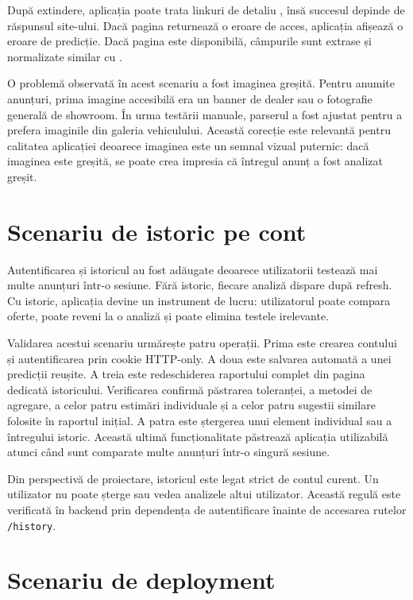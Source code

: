 După extindere, aplicația poate trata linkuri de detaliu \mobilede, însă succesul depinde de răspunsul site-ului. Dacă pagina returnează o eroare de acces, aplicația afișează o eroare de predicție. Dacă pagina este disponibilă, câmpurile sunt extrase și normalizate similar cu \autovit.

O problemă observată în acest scenariu a fost imaginea greșită. Pentru anumite anunțuri, prima imagine accesibilă era un banner de dealer sau o fotografie generală de showroom. În urma testării manuale, parserul a fost ajustat pentru a prefera imaginile din galeria vehiculului. Această corecție este relevantă pentru calitatea aplicației deoarece imaginea este un semnal vizual puternic: dacă imaginea este greșită, se poate crea impresia că întregul anunț a fost analizat greșit.

\section{Scenariu de istoric pe cont}
\label{sec:case-history}

Autentificarea și istoricul au fost adăugate deoarece utilizatorii testează mai multe anunțuri într-o sesiune. Fără istoric, fiecare analiză dispare după refresh. Cu istoric, aplicația devine un instrument de lucru: utilizatorul poate compara oferte, poate reveni la o analiză și poate elimina testele irelevante.

Validarea acestui scenariu urmărește patru operații. Prima este crearea contului și autentificarea prin cookie HTTP-only. A doua este salvarea automată a unei predicții reușite. A treia este redeschiderea raportului complet din pagina dedicată istoricului. Verificarea confirmă păstrarea toleranței, a metodei de agregare, a celor patru estimări individuale și a celor patru sugestii similare folosite în raportul inițial. A patra este ștergerea unui element individual sau a întregului istoric. Această ultimă funcționalitate păstrează aplicația utilizabilă atunci când sunt comparate multe anunțuri într-o singură sesiune.

Din perspectivă de proiectare, istoricul este legat strict de contul curent. Un utilizator nu poate șterge sau vedea analizele altui utilizator. Această regulă este verificată în backend prin dependența de autentificare înainte de accesarea rutelor \texttt{/history}.

\section{Scenariu de deployment}
\label{sec:case-deployment}

